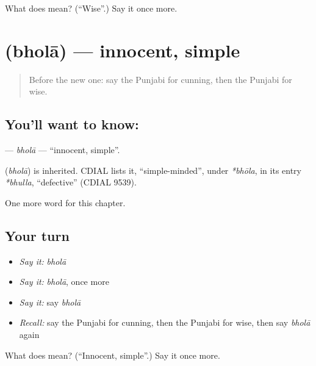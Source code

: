 \begin{tcolorbox}[breakable,colback=teal!4,colframe=teal!35!black,title={Before you move on}]
What does  mean? (\textquotedblleft{}Wise\textquotedblright{}.) Say it once more.
\end{tcolorbox}
\section[\texorpdfstring{\pa{ਭੋਲਾ} (bholā)}{ਭੋਲਾ (bholā)}]{ (bholā) — innocent, simple}

\label{lesson:PA-C141-bhola}



\begin{quote}
Before the new one: say the Punjabi for cunning, then the Punjabi for wise.
\end{quote}

\subsection*{You'll want to know: }
\textbf{} — \emph{bholā} — \textquotedblleft{}innocent, simple\textquotedblright{}.

\begin{cousinweb}
\textbf{} (\emph{bholā}) is inherited. CDIAL lists it, \textquotedblleft{}simple-minded\textquotedblright{}, under \emph{*bhōla}, in its entry \emph{*bhulla}, \textquotedblleft{}defective\textquotedblright{} (CDIAL 9539).
\end{cousinweb}

\begin{grammarlens}[title={What you've built}]
One more word for this chapter.
\end{grammarlens}

\subsection*{Your turn}
\begin{itemize}
\raggedright
  \item \emph{Say it:} \emph{bholā}
  \item \emph{Say it:} \emph{bholā}, once more
  \item \emph{Say it:} say \emph{bholā}
  \item \emph{Recall:} say the Punjabi for cunning, then the Punjabi for wise, then say \emph{bholā} again
\end{itemize}

\begin{tcolorbox}[breakable,colback=teal!4,colframe=teal!35!black,title={Before you move on}]
What does  mean? (\textquotedblleft{}Innocent, simple\textquotedblright{}.) Say it once more.
\end{tcolorbox}
